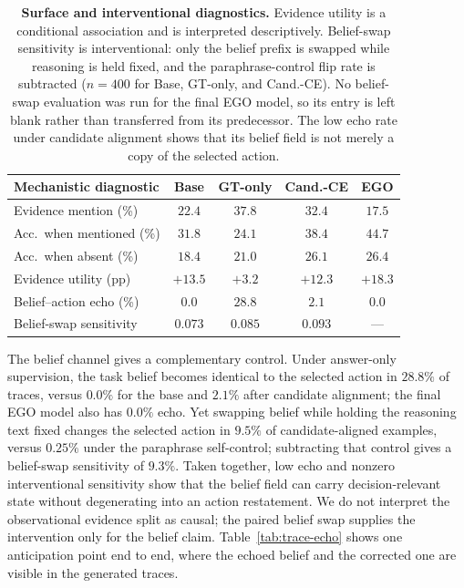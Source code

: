 \documentclass[letterpaper]{article}
\newcommand{\obs}[1]{\textcolor{measuredblue}{#1}}
\newcommand{\method}{\textsc{EGO}}
\begin{document}
\begin{table}[t]
\centering
\scriptsize
\setlength{\tabcolsep}{2.5pt}
\begin{tabular}{lcccc}
\toprule
Mechanistic diagnostic & Base & GT-only & Cand.-CE & \method{} \\
\midrule
Evidence mention (\%) & \obs{$22.4$} & \obs{$37.8$} & \obs{$32.4$} & \obs{$17.5$} \\
Acc.\ when mentioned (\%) & \obs{$31.8$} & \obs{$24.1$} & \obs{$38.4$} & \obs{$44.7$} \\
Acc.\ when absent (\%) & \obs{$18.4$} & \obs{$21.0$} & \obs{$26.1$} & \obs{$26.4$} \\
Evidence utility (pp) & \obs{$+13.5$} & \obs{$+3.2$} & \obs{$+12.3$} & \obs{$+18.3$} \\
\midrule
Belief--action echo (\%) & \obs{$0.0$} & \obs{$28.8$} & \obs{$2.1$} & \obs{$0.0$} \\
Belief-swap sensitivity & \obs{$0.073$} & \obs{$0.085$} & \obs{$0.093$} & --- \\
\bottomrule
\end{tabular}
\caption{\textbf{Surface and interventional diagnostics.} Evidence utility
is a conditional association and is interpreted descriptively.  Belief-swap
sensitivity is interventional: only the belief prefix is swapped while
reasoning is held fixed, and the paraphrase-control flip rate is subtracted
(\obs{$n{=}400$} for Base, GT-only, and Cand.-CE).  No belief-swap evaluation
was run for the final \method{} model, so its entry is left blank rather
than transferred from its predecessor.  The low echo rate under candidate
alignment shows that its belief field is not merely a copy of the selected
action.}
\label{tab:mechanism}
\end{table}

The belief channel gives a complementary control.  Under answer-only
supervision, the task belief becomes identical to the selected action in
\obs{$28.8\%$} of traces, versus \obs{$0.0\%$} for the base and
\obs{$2.1\%$} after candidate alignment; the final \method{} model also
has \obs{$0.0\%$} echo.  Yet swapping belief while holding the reasoning text
fixed changes the selected action in \obs{$9.5\%$} of candidate-aligned
examples, versus \obs{$0.25\%$} under the paraphrase self-control;
subtracting that control gives a belief-swap sensitivity of \obs{$9.3\%$}.
Taken together, low echo and nonzero
interventional sensitivity show that the belief field can carry
decision-relevant state without degenerating into an action restatement.
We do not interpret the observational evidence split as causal; the paired
belief swap supplies the intervention only for the belief claim.
Table~\ref{tab:trace-echo} shows one anticipation point end to end, where the
echoed belief and the corrected one are visible in the generated traces.
\end{document}
